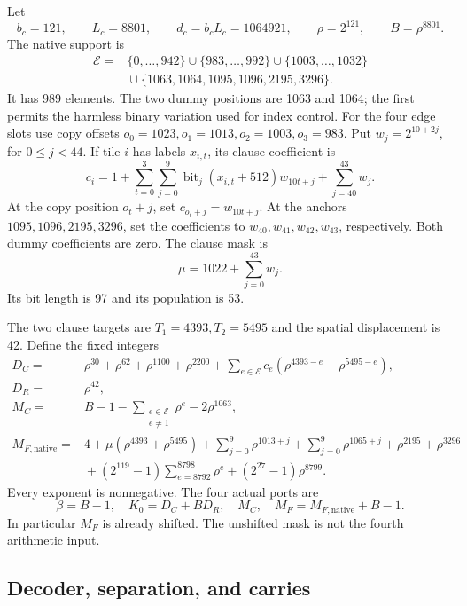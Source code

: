 Let
\[
 b_c=121,\qquad L_c=8801,\qquad d_c=b_cL_c=1064921,
 \qquad \rho=2^{121},\qquad B=\rho^{8801}.
\]
The native support is
\begin{align*}
 \mathcal E={}&\{0,\ldots,942\}\cup\{983,\ldots,992\}
              \cup\{1003,\ldots,1032\}\\
 &{}\cup\{1063,1064,1095,1096,2195,3296\}.
\end{align*}
It has 989 elements. The two dummy positions are 1063 and 1064;
the first permits the harmless binary variation used for index control.
For the four edge slots use copy offsets
$o_0=1023,o_1=1013,o_2=1003,o_3=983$.
Put $w_j=2^{10+2j}$, for $0\le j<44$.
If tile $i$ has labels $x_{i,t}$, its clause coefficient is
\[
 c_i=1+\sum_{t=0}^3\sum_{j=0}^9
       \operatorname{bit}_j(x_{i,t}+512)w_{10t+j}
       +\sum_{j=40}^{43}w_j.
\]
At the copy position $o_t+j$, set $c_{o_t+j}=w_{10t+j}$.
At the anchors $1095,1096,2195,3296$, set the coefficients to
$w_{40},w_{41},w_{42},w_{43}$, respectively. Both dummy coefficients
are zero. The clause mask is
\[
 \mu=1022+\sum_{j=0}^{43}w_j.
\]
Its bit length is 97 and its population is 53.

The two clause targets are $T_1=4393,T_2=5495$ and the spatial
displacement is 42. Define the fixed integers
\begin{align*}
 D_C={}&\rho^{30}+\rho^{62}+\rho^{1100}+\rho^{2200}
       +\sum_{e\in\mathcal E}c_e
                      (\rho^{4393-e}+\rho^{5495-e}),\\
 D_R={}&\rho^{42},\\
 M_C={}&B-1-\sum_{\substack{e\in\mathcal E\\e\ne1}}\rho^e
                -2\rho^{1063},\\
 M_{F,\mathrm{native}}={}&4+\mu(\rho^{4393}+\rho^{5495})
      +\sum_{j=0}^9\rho^{1013+j}
      +\sum_{j=0}^9\rho^{1065+j}+\rho^{2195}+\rho^{3296}\\
 &{}+(2^{119}-1)\sum_{e=8792}^{8798}\rho^e
             +(2^{27}-1)\rho^{8799}.
\end{align*}
Every exponent is nonnegative. The four actual ports are
\begin{equation}\label{eq:new-ports}
 \boxed{\beta=B-1,\quad K_0=D_C+BD_R,\quad M_C,\quad
 M_F=M_{F,\mathrm{native}}+B-1.}
\end{equation}
In particular $M_F$ is already shifted. The unshifted mask is not the
fourth arithmetic input.

\subsection{Decoder, separation, and carries}

